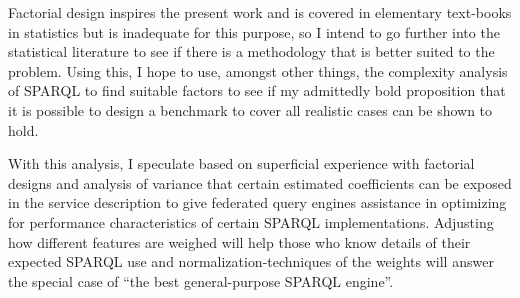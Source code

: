 \documentclass{llncs}
\begin{document}
Factorial design inspires the present work and is covered in
elementary text-books in statistics but is inadequate for this
purpose, so I intend to go further into the statistical literature to
see if there is a methodology that is better suited to the
problem. Using this, I hope to use, amongst other things, the
complexity analysis of SPARQL to find suitable factors to see if my
admittedly bold proposition that it is possible to design a benchmark
to cover all realistic cases can be shown to hold.

With this analysis, I speculate based on superficial experience with
factorial designs and analysis of variance that certain estimated
coefficients can be exposed in the service description to give
federated query engines assistance in optimizing for performance
characteristics of certain SPARQL implementations. Adjusting how
different features are weighed will help those who know details of
their expected SPARQL use and normalization-techniques of the weights
will answer the special case of ``the best general-purpose SPARQL
engine''.


%
%

\end{document}

